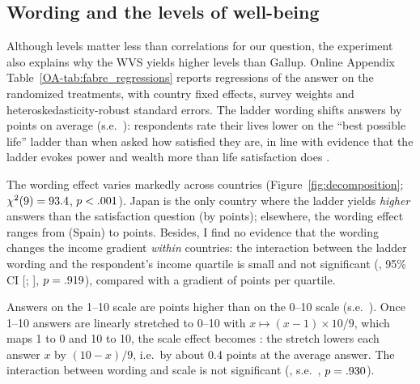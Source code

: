 \documentclass[12pt]{article}
\begin{document}
\subsection{Wording and the levels of well-being}\label{subsec:experiment}

Although levels matter less than correlations for our question, the experiment also explains why the WVS yields higher levels than Gallup. Online Appendix Table~\ref{OA-tab:fabre_regressions} reports regressions of the answer on the randomized treatments, with country fixed effects, survey weights and heteroskedasticity-robust standard errors. The ladder wording shifts answers by \effectLadder points on average (s.e.\ \seLadder): respondents rate their lives lower on the ``best possible life'' ladder than when asked how satisfied they are, in line with evidence that the ladder evokes power and wealth more than life satisfaction does \citep{nilsson_cantril_2024}. 

The wording effect varies markedly across countries (Figure~\ref{fig:decomposition}; $\chi^2(9) = 93.4$, $p < .001$). 
Japan is the only country where the ladder yields \textit{higher} answers than the satisfaction question (by \wordingJPN points); elsewhere, the wording effect ranges from \wordingMin (Spain) to \wordingMaxNegative points. Besides, I find no evidence that the wording changes the income gradient \textit{within} countries: the interaction between the ladder wording and the respondent's income quartile is small and not significant (\interactionLadderIncome, 95\% CI [\ciLowInteractionLadderIncome; \ciHighInteractionLadderIncome], $p = .919$), compared with a gradient of \gradientIncomeSatisfaction points per quartile.

Answers on the 1--10 scale are \effectScale points higher than on the 0--10 scale (s.e.\ \seScale). Once 1--10 answers are linearly stretched to 0--10 with $x \mapsto (x-1) \times 10/9$, which maps 1 to 0 and 10 to 10, the scale effect becomes \effectScaleZeroTen: the stretch lowers each answer $x$ by $(10-x)/9$, i.e.\ by about 0.4 points at the average answer. The interaction between wording and scale is not significant (\interactionLadderScale, s.e.\ \seInteractionLadderScale, $p = .930$).
\end{document}
